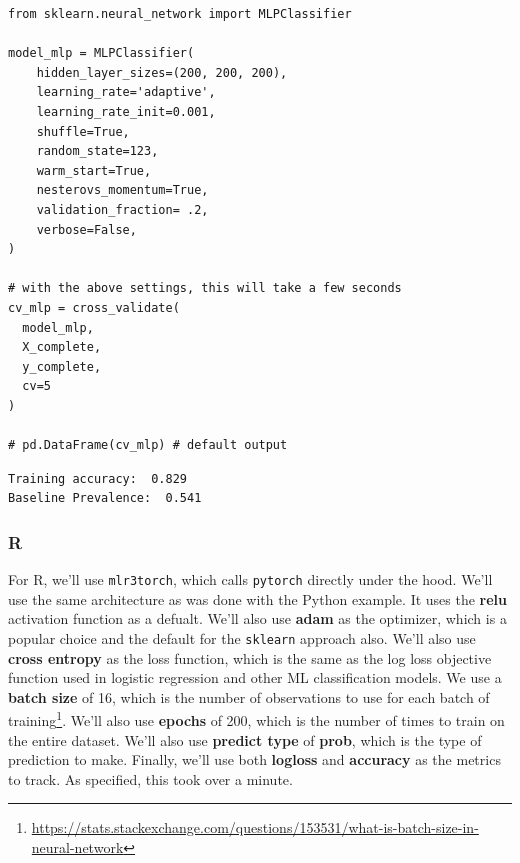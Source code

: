 \documentclass[
  letterpaper,
]{krantz}
\DeclareRobustCommand{\href}[2]{#2\footnote{\url{#1}}}
\begin{document}
\begin{verbatim}
from sklearn.neural_network import MLPClassifier

model_mlp = MLPClassifier(
    hidden_layer_sizes=(200, 200, 200),  
    learning_rate='adaptive',
    learning_rate_init=0.001,
    shuffle=True,
    random_state=123,
    warm_start=True,
    nesterovs_momentum=True,
    validation_fraction= .2,
    verbose=False,
)

# with the above settings, this will take a few seconds
cv_mlp = cross_validate(
  model_mlp, 
  X_complete, 
  y_complete, 
  cv=5
) 

# pd.DataFrame(cv_mlp) # default output
\end{verbatim}

\begin{verbatim}
Training accuracy:  0.829 
Baseline Prevalence:  0.541
\end{verbatim}

\subsubsection{R}

For R, we'll use \texttt{mlr3torch}, which calls \texttt{pytorch}
directly under the hood. We'll use the same architecture as was done
with the Python example. It uses the \textbf{relu} activation function
as a defualt. We'll also use \textbf{adam} as the optimizer, which is a
popular choice and the default for the \texttt{sklearn} approach also.
We'll also use \textbf{cross entropy} as the loss function, which is the
same as the log loss objective function used in logistic regression and
other ML classification models. We use a \textbf{batch size} of 16,
which is the number of observations to use for each
\href{https://stats.stackexchange.com/questions/153531/what-is-batch-size-in-neural-network}{batch
of training}. We'll also use \textbf{epochs} of 200, which is the number
of times to train on the entire dataset. We'll also use \textbf{predict
type} of \textbf{prob}, which is the type of prediction to make.
Finally, we'll use both \textbf{logloss} and \textbf{accuracy} as the
metrics to track. As specified, this took over a minute.
\end{document}
